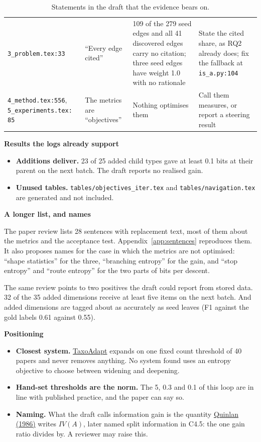 \documentclass[10pt,a4paper]{article}
\newcommand{\code}[1]{\texttt{#1}}
\newcommand{\lab}[1]{\par\vspace{0.35em}\textbf{#1}\par\nobreak}
\newenvironment{rtable}[1]{\begin{table}[!htb]\caption{#1}\small}{\end{table}}
\begin{document}
\begin{rtable}{Statements in the draft that the evidence bears on.\label{tab:paper}}
\begin{tabularx}{\linewidth}{@{}P{2.7cm} P{3.5cm} L P{3.9cm}@{}}
\code{3\_problem.tex:33} & ``Every edge cited'' & 109 of the 279 seed edges and all 41 discovered edges carry no citation; three seed edges have weight 1.0 with no rationale & State the cited share, as RQ2 already does; fix the fallback at \code{is\_a.py:104} \\
\code{4\_method.tex:556}, \code{5\_experiments.tex:} \code{85} & The metrics are ``objectives'' & Nothing optimises them & Call them measures, or report a steering result \\
\bottomrule
\end{tabularx}
\end{rtable}

\lab{Results the logs already support}
\begin{itemize}
\item \textbf{Additions deliver.} 23 of 25 added child types gave at least 0.1 bits at their parent on the next batch. The draft reports no realised gain.
\item \textbf{Unused tables.} \code{tables/objectives\_iter.tex} and \code{tables/navigation.tex} are generated and not included.
\end{itemize}

\lab{A longer list, and names}
The paper review lists 28 sentences with replacement text, most of them about the metrics and the
acceptance test. Appendix~\ref{app:sentences} reproduces them. It also proposes names for the case in which
the metrics are not optimised: ``shape statistics'' for the three, ``branching entropy'' for the gain, and
``stop entropy'' and ``route entropy'' for the two parts of bits per descent.

The same review points to two positives the draft could report from stored data. 32 of the 35 added
dimensions receive at least five items on the next batch. And added dimensions are tagged about as
accurately as seed leaves (F1 against the gold labels 0.61 against 0.55).

\lab{Positioning}
\begin{itemize}
\item \textbf{Closest system.} \href{https://arxiv.org/html/2506.10737v1}{TaxoAdapt} expands on one fixed count threshold of 40 papers and never removes anything. No system found uses an entropy objective to choose between widening and deepening.
\item \textbf{Hand-set thresholds are the norm.} The 5, 0.3 and 0.1 of this loop are in line with published practice, and the paper can say so.
\item \textbf{Naming.} What the draft calls information gain is the quantity \href{https://hunch.net/~coms-4771/quinlan.pdf}{Quinlan (1986)} writes $IV(A)$, later named split information in C4.5: the one gain ratio divides by. A reviewer may raise this.
\end{itemize}
\end{document}
